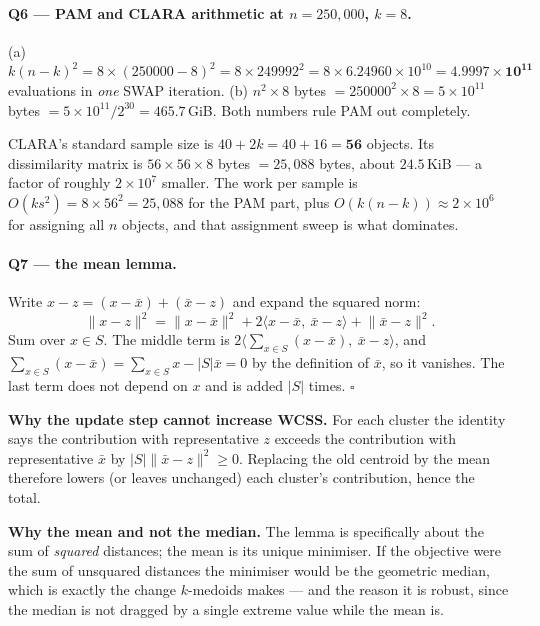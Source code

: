 \documentclass[11pt]{article}
\begin{document}
\paragraph{Q6 --- PAM and CLARA arithmetic at $n = 250{,}000$, $k = 8$.}
(a) $k(n-k)^2 = 8 \times (250000-8)^2 = 8 \times 249992^2
= 8 \times 6.24960\times10^{10} = \mathbf{4.9997 \times 10^{11}}$
evaluations in \emph{one} SWAP iteration.
(b) $n^2 \times 8$ bytes $= 250000^2 \times 8 = 5 \times 10^{11}$ bytes
$= 5\times10^{11} / 2^{30} = \mathbf{465.7}$\,GiB.
Both numbers rule PAM out completely.

CLARA's standard sample size is $40 + 2k = 40 + 16 = \mathbf{56}$ objects. Its
dissimilarity matrix is $56 \times 56 \times 8$ bytes $= 25{,}088$ bytes,
about $\mathbf{24.5}$\,KiB --- a factor of roughly $2 \times 10^{7}$ smaller.
The work per sample is $O(k s^2) = 8 \times 56^2 = 25{,}088$ for the PAM part,
plus $O(k(n-k)) \approx 2 \times 10^{6}$ for assigning all $n$ objects, and
that assignment sweep is what dominates.

\paragraph{Q7 --- the mean lemma.}
Write $x - z = (x - \bar{x}) + (\bar{x} - z)$ and expand the squared norm:
\[
  \lVert x-z\rVert^2 = \lVert x-\bar{x}\rVert^2
    + 2\langle x-\bar{x},\ \bar{x}-z\rangle + \lVert\bar{x}-z\rVert^2 .
\]
Sum over $x \in S$. The middle term is
$2\langle \sum_{x\in S}(x-\bar{x}),\ \bar{x}-z\rangle$, and
$\sum_{x \in S}(x - \bar{x}) = \sum_{x\in S}x - |S|\bar{x} = 0$ by the
definition of $\bar{x}$, so it vanishes. The last term does not depend on $x$
and is added $|S|$ times. \ensuremath{\square}

\textbf{Why the update step cannot increase WCSS.} For each cluster the
identity says the contribution with representative $z$ exceeds the
contribution with representative $\bar{x}$ by $|S|\lVert\bar{x}-z\rVert^2 \ge
0$. Replacing the old centroid by the mean therefore lowers (or leaves
unchanged) each cluster's contribution, hence the total.

\textbf{Why the mean and not the median.} The lemma is specifically about the
sum of \emph{squared} distances; the mean is its unique minimiser. If the
objective were the sum of unsquared distances the minimiser would be the
geometric median, which is exactly the change $k$-medoids makes --- and the
reason it is robust, since the median is not dragged by a single extreme
value while the mean is.
\end{document}
